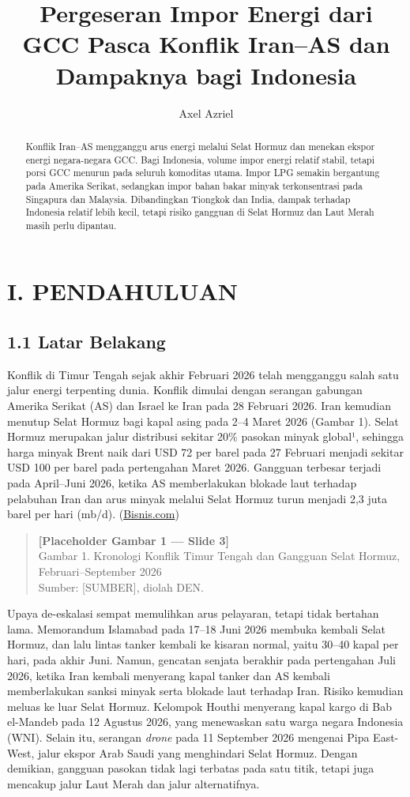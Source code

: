 \documentclass[
  manuscript=article,
  layout=brief,
  year=2026,
  volume=1,
]{den}
\title{Pergeseran Impor Energi dari GCC Pasca Konflik Iran--AS dan
Dampaknya bagi Indonesia}
\author{Axel Azriel \orcid{0000-0001-8695-0514}}
\affiliation{Dewan Ekonomi Nasional}
\begin{document}
\begin{abstract}
Konflik Iran--AS mengganggu arus energi melalui Selat Hormuz dan menekan
ekspor energi negara-negara GCC. Bagi Indonesia, volume impor energi
relatif stabil, tetapi porsi GCC menurun pada seluruh komoditas utama.
Impor LPG semakin bergantung pada Amerika Serikat, sedangkan impor bahan
bakar minyak terkonsentrasi pada Singapura dan Malaysia. Dibandingkan
Tiongkok dan India, dampak terhadap Indonesia relatif lebih kecil,
tetapi risiko gangguan di Selat Hormuz dan Laut Merah masih perlu
dipantau.
\end{abstract}

\section{I. PENDAHULUAN}\label{i.-pendahuluan}

\subsection{1.1 Latar Belakang}\label{latar-belakang}

Konflik di Timur Tengah sejak akhir Februari 2026 telah mengganggu salah
satu jalur energi terpenting dunia. Konflik dimulai dengan serangan
gabungan Amerika Serikat (AS) dan Israel ke Iran pada 28 Februari 2026.
Iran kemudian menutup Selat Hormuz bagi kapal asing pada 2--4 Maret 2026
(Gambar 1). Selat Hormuz merupakan jalur distribusi sekitar 20\% pasokan
minyak global¹, sehingga harga minyak Brent naik dari USD 72 per barel
pada 27 Februari menjadi sekitar USD 100 per barel pada pertengahan
Maret 2026. Gangguan terbesar terjadi pada April--Juni 2026, ketika AS
memberlakukan blokade laut terhadap pelabuhan Iran dan arus minyak
melalui Selat Hormuz turun menjadi 2,3 juta barel per hari (mb/d).
(\href{https://ekonomi.bisnis.com/read/20260312/10/1959861/purbaya-ungkap-risiko-konflik-iran-ke-apbn-subsidi-energi-bunga-utang-bengkak}{Bisnis.com})

\begin{quote}
\textbf{{[}Placeholder Gambar 1 --- Slide 3{]}}\\
Gambar 1. Kronologi Konflik Timur Tengah dan Gangguan Selat Hormuz,
Februari--September 2026\\
Sumber: {[}SUMBER{]}, diolah DEN.
\end{quote}

Upaya de-eskalasi sempat memulihkan arus pelayaran, tetapi tidak
bertahan lama. Memorandum Islamabad pada 17--18 Juni 2026 membuka
kembali Selat Hormuz, dan lalu lintas tanker kembali ke kisaran normal,
yaitu 30--40 kapal per hari, pada akhir Juni. Namun, gencatan senjata
berakhir pada pertengahan Juli 2026, ketika Iran kembali menyerang kapal
tanker dan AS kembali memberlakukan sanksi minyak serta blokade laut
terhadap Iran. Risiko kemudian meluas ke luar Selat Hormuz. Kelompok
Houthi menyerang kapal kargo di Bab el-Mandeb pada 12 Agustus 2026, yang
menewaskan satu warga negara Indonesia (WNI). Selain itu, serangan
\emph{drone} pada 11 September 2026 mengenai Pipa East-West, jalur
ekspor Arab Saudi yang menghindari Selat Hormuz. Dengan demikian,
gangguan pasokan tidak lagi terbatas pada satu titik, tetapi juga
mencakup jalur Laut Merah dan jalur alternatifnya.
\end{document}
